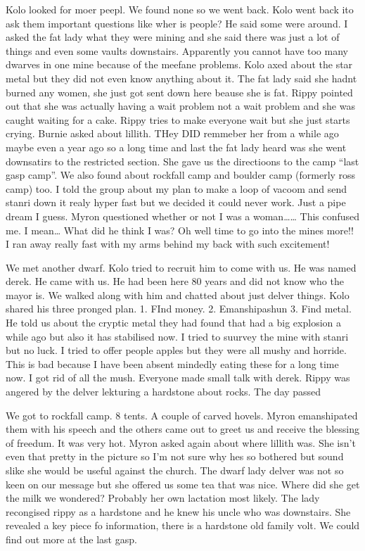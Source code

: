 Kolo looked for moer peepl. We found none so we went back. Kolo went back ito ask them important questions like wher is people? He said some were around. I asked the fat lady what they were mining and she said there was just a lot of things and even some vaults downstairs. Apparently you cannot have too many dwarves in one mine because of the meefane problems. Kolo axed about the star metal but they did not even know anything about it. The fat lady said she hadnt burned any women, she just got sent down here beause she is fat. Rippy pointed out that she was actually having a wait problem not a wait problem and she was caught waiting for a cake. Rippy tries to make everyone wait but she just starts crying. Burnie asked about lillith. THey DID remmeber her from a while ago maybe even a year ago so a long time and last the fat lady heard was she went downsatirs to the restricted section. She gave us the directioons to the camp “last gasp camp”. We also found about rockfall camp and boulder camp (formerly ross camp) too. I told the group about my plan to make a loop of vacoom and send stanri down it realy hyper fast but we decided it could never work. Just a pipe dream I guess. Myron questioned whether or not I was a woman…… This confused me. I mean… What did he think I was? Oh well time to go into the mines more!! I ran away really fast with my arms behind my back with such excitement!\medskip

We met another dwarf. Kolo tried to recruit him to come with us. He was named derek. He came with us. He had been here 80 years and did not know who the mayor is. We walked along with him and chatted about just delver things. Kolo shared his three pronged plan. 1. FInd money. 2. Emanshipashun 3. Find metal. He told us about the cryptic metal they had found that had a big explosion a while ago but also it has stabilised now. I tried to suurvey the mine with stanri but no luck. I tried to offer people apples but they were all mushy and horride. This is bad because I have been absent mindedly eating these for a long time now. I got rid of all the mush. Everyone made small talk with derek. Rippy was angered by the delver lekturing a hardstone about rocks. The day passed\medskip

We got to rockfall camp. 8 tents. A couple of carved hovels. Myron emanshipated them with his speech and the others came out to greet us and receive the blessing of freedum. It was very hot. Myron asked again about where lillith was. She isn’t even that pretty in the picture so I’m not sure why hes so bothered but sound slike she would be useful against the church. The dwarf lady delver was not so keen on our message but she offered us some tea that was nice. Where did she get the milk we wondered? Probably her own lactation most likely. The lady recongised rippy as a hardstone and he knew his uncle who was downstairs. She revealed a key piece fo information, there is a hardstone old family volt. We could find out more at the last gasp.\medskip

